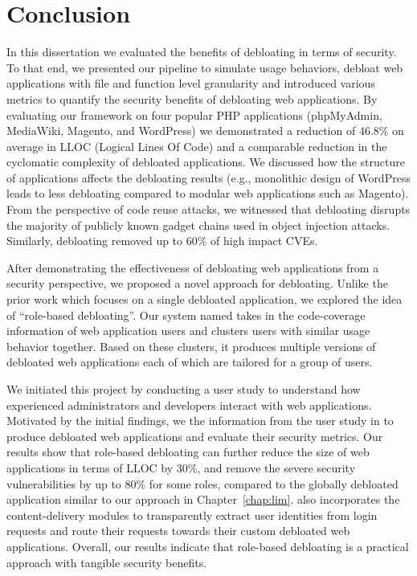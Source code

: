 \chapter{Conclusion}
\label{chap:conclusion}

In this dissertation we evaluated the benefits of debloating in terms of security. 
To that end, we presented our pipeline to simulate usage behaviors, debloat web applications with file and function level granularity and introduced various metrics to quantify the security benefits of debloating web applications. 
By evaluating our framework on four popular PHP applications (phpMyAdmin, MediaWiki, Magento, and WordPress) we demonstrated a reduction of 46.8\% on average in LLOC (Logical Lines Of Code) and a comparable reduction in the cyclomatic complexity of debloated applications. 
We discussed how the structure of applications affects the debloating results (e.g., monolithic design of WordPress leads to less debloating compared to modular web applications such as Magento). 
From the perspective of code reuse attacks, we witnessed that debloating disrupts the majority of publicly known gadget chains used in object injection attacks. 
Similarly, debloating removed up to 60\% of high impact CVEs. 

After demonstrating the effectiveness of debloating web applications from a security perspective, we proposed a novel approach for debloating. 
Unlike the prior work which focuses on a single debloated application, we explored the idea of ``role-based debloating''. 
Our system named \dbltr{} takes in the code-coverage information of web application users and clusters users with similar usage behavior together. 
Based on these clusters, it produces multiple versions of debloated web applications each of which are tailored for a group of users. 

We initiated this project by conducting a user study to understand how experienced administrators and developers interact with web applications. 
Motivated by the initial findings, we the information from the user study in \dbltr{} to produce debloated web applications and evaluate their security metrics. 
Our results show that role-based debloating can further reduce the size of web applications in terms of LLOC by 30\%, and remove the severe security vulnerabilities by up to 80\% for some roles, compared to the globally debloated application similar to our approach in Chapter~\ref{chap:lim}. 
\dbltr{} also incorporates the content-delivery modules to transparently extract user identities from login requests and route their requests towards their custom debloated web applications. 
Overall, our results indicate that role-based debloating is a practical approach with tangible security benefits. 

